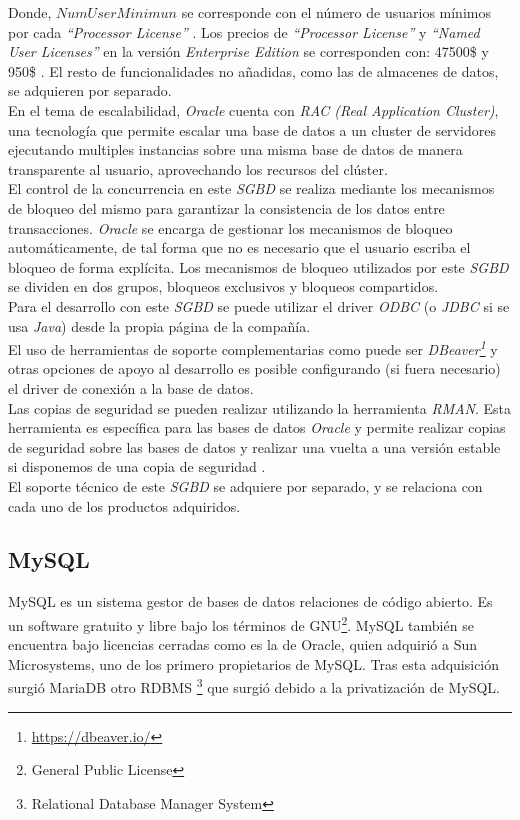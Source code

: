 \documentclass{article}
\begin{document}
Donde, $NumUserMinimun$ se corresponde con el número de usuarios mínimos por cada \emph{``Processor License''} \cite{ORA:3}. Los precios de \emph{``Processor License''} y \emph{``Named User Licenses''} en la versión \emph{Enterprise Edition} se corresponden con: 47500\$ y 950\$ \cite{ORA:4}. El resto de funcionalidades no añadidas, como las de almacenes de datos, se adquieren por separado. \\

En el tema de escalabilidad, \emph{Oracle} cuenta con \emph{RAC (Real Application Cluster)}, una tecnología que permite escalar una base de datos a un cluster de servidores ejecutando multiples instancias sobre una misma base de datos de manera transparente al usuario, aprovechando los recursos del clúster. \cite{ORA:5} \\

El control de la concurrencia en este \emph{SGBD} se realiza mediante los mecanismos de bloqueo del mismo para garantizar la consistencia de los datos entre transacciones. \emph{Oracle} se encarga de gestionar los mecanismos de bloqueo automáticamente, de tal forma que no es necesario que el usuario escriba el bloqueo de forma explícita.\cite{ORA:6}
Los mecanismos de bloqueo utilizados por este \emph{SGBD} se dividen en dos grupos, bloqueos exclusivos y bloqueos compartidos. \cite{ORA:7} \\

Para el desarrollo con este \emph{SGBD} se puede utilizar el driver \emph{ODBC} (o \emph{JDBC} si se usa \emph{Java}) desde la propia página de la compañía. \\
El uso de herramientas de soporte complementarias como puede ser \emph{DBeaver\footnote{\url{https://dbeaver.io/}}} y otras opciones de apoyo al desarrollo es posible configurando (si fuera necesario) el driver de conexión a la base de datos. \\
Las copias de seguridad se pueden realizar utilizando la herramienta \emph{RMAN}. Esta herramienta es específica para las bases de datos \emph{Oracle} y permite realizar copias de seguridad sobre las bases de datos y realizar una vuelta a una versión estable si disponemos de una copia de seguridad \cite{ORA:8}. \\

El soporte técnico de este \emph{SGBD} se adquiere por separado, y se relaciona con cada uno de los productos adquiridos. \cite{ORA:4} \\

\subsection{MySQL}
MySQL es un sistema gestor de bases de datos relaciones de código abierto. 
Es un software gratuito y libre bajo los términos de GNU\footnote{General Public License}. MySQL también se encuentra bajo licencias cerradas como es la de Oracle, quien adquirió a Sun Microsystems, uno de los primero propietarios de MySQL. Tras esta adquisición surgió MariaDB otro RDBMS \footnote{Relational Database Manager System} que surgió debido a la privatización de MySQL.\\
\end{document}

